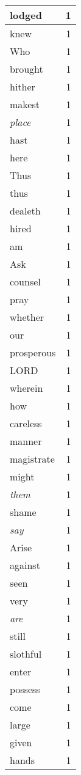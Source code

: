 \begin{center}
\begin{longtable}{l|r}
lodged & 1\\ \hline 
knew & 1\\ \hline 
Who & 1\\ \hline 
brought & 1\\ \hline 
hither & 1\\ \hline 
makest & 1\\ \hline 
\emph{place} & 1\\ \hline 
hast & 1\\ \hline 
here & 1\\ \hline 
Thus & 1\\ \hline 
thus & 1\\ \hline 
dealeth & 1\\ \hline 
hired & 1\\ \hline 
am & 1\\ \hline 
Ask & 1\\ \hline 
counsel & 1\\ \hline 
pray & 1\\ \hline 
whether & 1\\ \hline 
our & 1\\ \hline 
prosperous & 1\\ \hline 
LORD & 1\\ \hline 
wherein & 1\\ \hline 
how & 1\\ \hline 
careless & 1\\ \hline 
manner & 1\\ \hline 
magistrate & 1\\ \hline 
might & 1\\ \hline 
\emph{them} & 1\\ \hline 
shame & 1\\ \hline 
\emph{say} & 1\\ \hline 
Arise & 1\\ \hline 
against & 1\\ \hline 
seen & 1\\ \hline 
very & 1\\ \hline 
\emph{are} & 1\\ \hline 
still & 1\\ \hline 
slothful & 1\\ \hline 
enter & 1\\ \hline 
possess & 1\\ \hline 
come & 1\\ \hline 
large & 1\\ \hline 
given & 1\\ \hline 
hands & 1\\ \hline 

\end{longtable}
\end{center}
